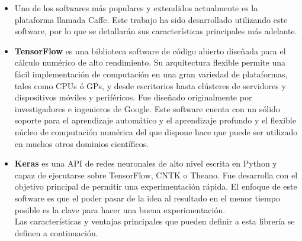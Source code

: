 \documentclass[a4paper, 12pt, spanish, chapterprefix, numbers=noenddot]{book}
\begin{document}
\begin{itemize}
\item Uno de los softwares más populares y extendidos actualmente es la plataforma llamada Caffe\cite{Caffe}. Este trabajo ha sido desarrollado utilizando este software, por lo que se detallarán sus características principales más adelante.
\item \textbf{TensorFlow}\cite{TensorFlow} es una biblioteca software de código abierto diseñada para el cálculo numérico de alto rendimiento. Su arquitectura flexible permite una fácil implementación de computación en una gran variedad de plataformas, tales como CPUs ó GPs, y desde escritorios hasta clústeres de servidores y dispositivos móviles y periféricos. Fue diseñado originalmente por investigadores e ingenieros de Google. Este software cuenta con un sólido soporte para el aprendizaje automático y el aprendizaje profundo y el flexible núcleo de computación numérica del que dispone hace que puede ser utilizado en muchos otros dominios científicos.

\item \textbf{Keras}\cite{Keras} es una API de redes neuronales de alto nivel escrita en Python y capaz de ejecutarse sobre TensorFlow, CNTK o Theano. Fue desarrolla con el objetivo principal de permitir una experimentación rápida. El enfoque de este software es que el poder pasar de la idea al resultado en el menor tiempo posible es la clave para hacer una buena experimentación.\\

Las características y ventajas principales que pueden definir a esta librería se definen a continuación.


\end{itemize}
\end{document}
